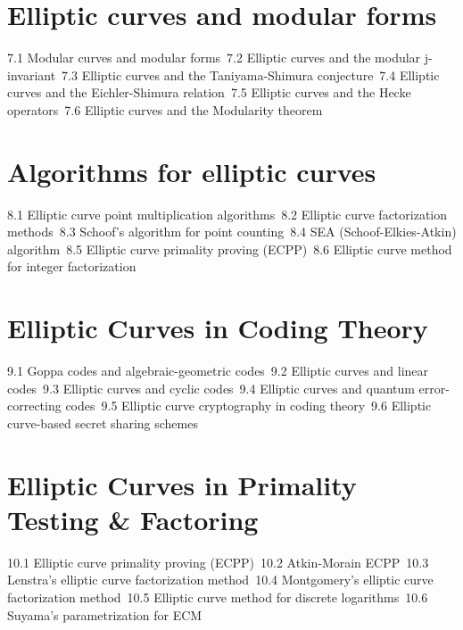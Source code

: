 \section{Elliptic curves and modular forms}
7.1 Modular curves and modular forms\
7.2 Elliptic curves and the modular j-invariant\
7.3 Elliptic curves and the Taniyama-Shimura conjecture\
7.4 Elliptic curves and the Eichler-Shimura relation\
7.5 Elliptic curves and the Hecke operators\
7.6 Elliptic curves and the Modularity theorem\
\section{Algorithms for elliptic curves}
8.1 Elliptic curve point multiplication algorithms\
8.2 Elliptic curve factorization methods\
8.3 Schoof's algorithm for point counting\
8.4 SEA (Schoof-Elkies-Atkin) algorithm\
8.5 Elliptic curve primality proving (ECPP)\
8.6 Elliptic curve method for integer factorization\
\section{Elliptic Curves in Coding Theory}
9.1 Goppa codes and algebraic-geometric codes\
9.2 Elliptic curves and linear codes\
9.3 Elliptic curves and cyclic codes\
9.4 Elliptic curves and quantum error-correcting codes\
9.5 Elliptic curve cryptography in coding theory\
9.6 Elliptic curve-based secret sharing schemes\
\section{Elliptic Curves in Primality Testing \& Factoring}
10.1 Elliptic curve primality proving (ECPP)\
10.2 Atkin-Morain ECPP\
10.3 Lenstra's elliptic curve factorization method\
10.4 Montgomery's elliptic curve factorization method\
10.5 Elliptic curve method for discrete logarithms\
10.6 Suyama's parametrization for ECM\
